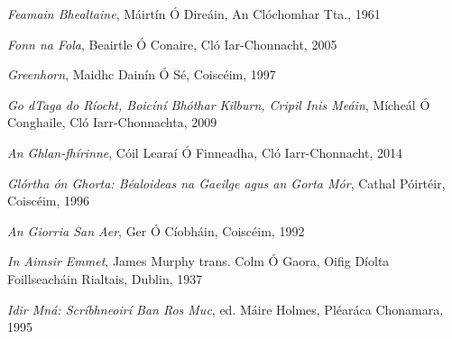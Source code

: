 \documentclass[output=paper,colorlinks,citecolor=brown]{langscibook}
\begin{document}
\begin{description}[leftmargin=!,labelwidth=\widthof{\textsc{agmts:}},font=\normalfont\scshape,noitemsep]
\item[fb:]  \textit{Feamain Bhealtaine}, Máirtín Ó Direáin, An Clóchomhar Tta., 1961               
\item[ff:]  \textit{Fonn na Fola},   Beairtle Ó Conaire, Cló Iar-Chonnacht, 2005                   
\item[g:]  \textit{Greenhorn},  Maidhc Dainín Ó Sé, Coiscéim, 1997 
\item[gddr:]  \textit{Go dTaga do Ríocht, Boicíní Bhóthar Kilburn, Cripil Inis Meáin}, Mícheál Ó Conghaile, 
                     Cló Iarr-Chonnachta, 2009                                                              
\item[gfh:]  \textit{An Ghlan-fhírinne}, Cóil Learaí Ó Finneadha, Cló Iarr-Chonnacht, 2014          
\item[gog:]  \textit{Glórtha ón Ghorta: Béaloideas na Gaeilge agus an Gorta Mór}, Cathal Póirtéir,
                     Coiscéim, 1996                                                                         
\item[gsa:]  \textit{An Giorria San Aer},  Ger Ó Cíobháin, Coiscéim, 1992                           
\item[iae:]  \textit{In Aimsir Emmet}, James Murphy trans. Colm Ó Gaora, Oifig Díolta Foillseacháin Rialtais,
                     Dublin, 1937         
\item[imsbrm:]  \textit{Idir Mná: Scríbhneoirí Ban Ros Muc}, ed. Máire Holmes, Pléar\-áca Chonamara, 1995  


\end{description}
\end{document}
